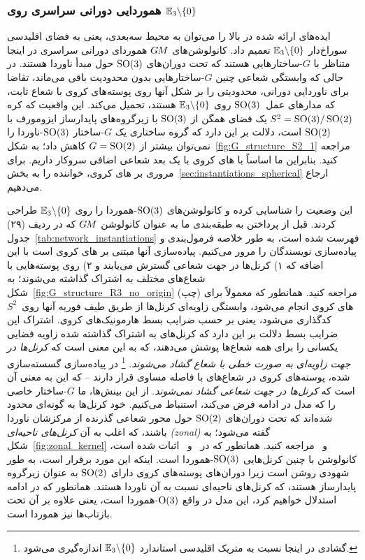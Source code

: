 

\subsubsection*{هموردایی دورانی سراسری روی $\mathbb{E}_3 \backslash \{0\}$}
\label{sec:punctured_euclidean_3dim}

ایده‌های ارائه شده در بالا را می‌توان به محیط سه‌بعدی، یعنی به فضای اقلیدسی سوراخ‌دار $\mathbb{E}_3 \backslash \{0\}$ تعمیم داد.
کانولوشن‌های $G\mkern-1.4muM$ هموردای دورانی سراسری در اینجا متناظر با $G$-ساختارهایی هستند که تحت دوران‌های $\operatorname{SO}(3)$ حول مبدأ ناوردا هستند.
در حالی که وابستگی شعاعی چنین $G$-ساختارهایی بدون محدودیت باقی می‌ماند، تقاضا برای ناوردایی دورانی، محدودیتی را بر شکل آنها روی پوسته‌های کروی با شعاع ثابت، که مدارهای عمل~$\operatorname{SO}(3)$ روی $\mathbb{E}_3 \backslash \{0\}$ هستند، تحمیل می‌کند.
این واقعیت که کره $S^2 = \operatorname{SO}(3)/\operatorname{SO}(2)$ یک فضای همگن از $\operatorname{SO}(3)$ با زیرگروه‌های پایدارساز ایزومورف با $\operatorname{SO}(2)$ است، دلالت بر این دارد که گروه ساختاری یک $G$-ساختار $\operatorname{SO}(3)$-ناوردا را نمی‌توان بیشتر از $G=\operatorname{SO}(2)$ کاهش داد؛ به شکل~\ref{fig:G_structure_S2_1} مراجعه کنید.
بنابراین ما اساساً با های کروی با یک بعد شعاعی اضافی سروکار داریم.
برای مروری بر های کروی، خواننده را به بخش~\ref{sec:instantiations_spherical} ارجاع می‌دهیم.


\citet{ramasinghe2019representation} این وضعیت را شناسایی کرده و کانولوشن‌های $\operatorname{SO}(3)$-هموردا را روی $\mathbb{E}_3 \backslash \{0\}$ طراحی کردند.
قبل از پرداختن به طبقه‌بندی ما به عنوان کانولوشن $G\mkern-1.4muM$ که در ردیف (۲۹) جدول~\ref{tab:network_instantiations} فهرست شده است، به طور خلاصه فرمول‌بندی و پیاده‌سازی نویسندگان را مرور می‌کنیم.
پیاده‌سازی آنها مبتنی بر های کروی است با این اضافه که
۱) کرنل‌ها در جهت شعاعی گسترش می‌یابند و
۲) روی پوسته‌هایی با شعاع‌های مختلف به اشتراک گذاشته می‌شوند؛ به شکل~\ref{fig:G_structure_R3_no_origin} (چپ) مراجعه کنید.
همانطور که معمولاً برای های کروی انجام می‌شود، وابستگی زاویه‌ای کرنل‌ها از طریق طیف فوریه آنها روی~$S^2$ کدگذاری می‌شود، یعنی بر حسب ضرایب بسط هارمونیک‌های کروی.
اشتراک این ضرایب بسط دلالت بر این دارد که کرنل‌های به اشتراک گذاشته شده زاویه فضایی یکسانی را برای همه شعاع‌ها پوشش می‌دهند، که به این معنی است که \emph{کرنل‌ها در جهت زاویه‌ای به صورت خطی با شعاع گشاد می‌شوند}.%
\footnote{
	گشادی در اینجا نسبت به متریک اقلیدسی استاندارد $\mathbb{E}_3 \backslash \{0\}$ اندازه‌گیری می‌شود.
}
در پیاده‌سازی گسسته‌سازی شده، پوسته‌های کروی در شعاع‌های با فاصله مساوی قرار دارند -- که این به معنی آن است که \emph{کرنل‌ها در جهت شعاعی گشاد نمی‌شوند}.
از این بینش‌ها، ما $G$-ساختار خاصی را که مدل در ادامه فرض می‌کند، استنباط می‌کنیم.
خود کرنل‌ها به گونه‌ای محدود شده‌اند که تحت دوران‌های $\operatorname{SO}(2)$ حول محور شعاعی گذرنده از مرکزشان ناوردا باشند، که اغلب به آن \emph{کرنل‌های ناحیه‌ای (zonal)} گفته می‌شود؛
به شکل~\ref{fig:zonal_kernel} و~\cite{esteves2018zonalSpherical} مراجعه کنید.
همانطور که در~\cite{esteves2018zonalSpherical} و~\cite{ramasinghe2019representation} اثبات شده است، کانولوشن با چنین کرنل‌هایی $\operatorname{SO}(3)$-هموردا است.
اینکه این مورد برقرار است، به طور شهودی روشن است زیرا دوران‌های پوسته‌های کروی دارای $\operatorname{SO}(2)$ به عنوان زیرگروه پایدارساز هستند، که کرنل‌های ناحیه‌ای نسبت به آن ناوردا هستند.
همانطور که در ادامه استدلال خواهیم کرد، این مدل در واقع $\operatorname{O}(3)$-هموردا است، یعنی علاوه بر آن تحت بازتاب‌ها نیز هموردا است.


